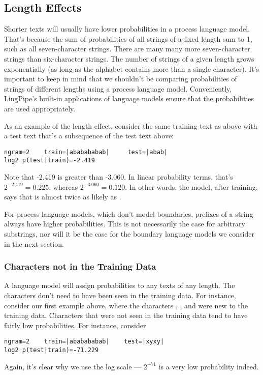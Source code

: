 \subsection{Length Effects}

Shorter texts will usually have lower probabilities in a process
language model.  That's because the sum of probabilities of all
strings of a fixed length sum to 1, such as all seven-character
strings.  There are many many more seven-character strings than
six-character strings.  The number of strings of a given length grows
exponentially (as long as the alphabet contains more than a single
character).  It's important to keep in mind that we shouldn't be
comparing probabilities of strings of different lengths using a
process language model.  Conveniently, LingPipe's built-in
applications of language models ensure that the probabilities are used
appropriately.

As an example of the length effect, consider the same training text as
above with a test text that's a subsequence of the test text above:
%
\begin{verbatim}
ngram=2    train=|ababababab|     test=|abab|
log2 p(test|train)=-2.419
\end{verbatim}
%
Note that -2.419 is greater than -3.060.  In linear probability terms,
that's $2^{-2.419} = 0.225$, whereas $2^{-3.060} = 0.120$.  In other
words, the model, after training, says that  is
almost twice as likely as .

For process language models, which don't model boundaries, prefixes of
a string always have higher probabilities.  This is not necessarily
the case for arbitrary substrings, nor will it be the case for the
boundary language models we consider in the next section.

\subsubsection{Characters not in the Training Data}

A language model will assign probabilities to any texts of any length.
The characters don't need to have been seen in the training data.  For
instance, consider our first example above, where the characters
, , and  were new to the
training data.  Characters that were not seen in the training data tend
to have fairly low probabilities.  For instance, consider
%
\begin{verbatim}
ngram=2    train=|ababababab|    test=|xyxy|
log2 p(test|train)=-71.229
\end{verbatim}
%
Again, it's clear why we use the log scale --- $2^{-71}$ is a very low
probability indeed.

